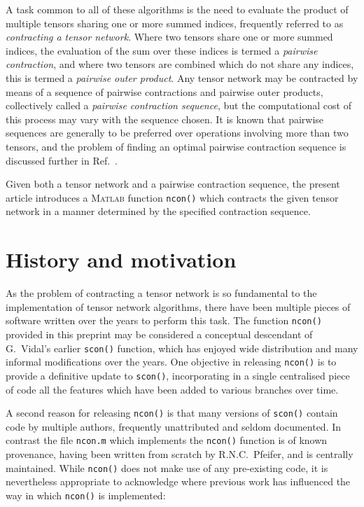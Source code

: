 \documentclass[aps,prb,reprint,superscriptaddress,amsmath,amsfonts]{revtex4-1}
\theoremstyle{definition}
\newcommand{\rcite}[1]{Ref.~\onlinecite{#1}}
\newcommand{\MATLAB}{\textsc{Matlab}}
\newcommand{\ttt}[1]{\texttt{#1}}
\begin{document}
A task common to all of these algorithms is the need to evaluate the product of multiple tensors sharing one or more summed indices, frequently referred to as \emph{contracting a tensor network}. Where two tensors share one or more summed indices, the evaluation of the sum over these indices is termed a \emph{pairwise contraction}, and where two tensors are combined which do not share any indices, this is termed a \emph{pairwise outer product}. Any tensor network may be contracted by means of a sequence of pairwise contractions and pairwise outer products, collectively called a \emph{pairwise contraction sequence}, but the computational cost of this process may vary with the sequence chosen. It is known\cite{pfeifer2013a} that pairwise sequences are generally to be preferred over operations involving more than two tensors, and the problem of finding an optimal pairwise contraction sequence is discussed further in \rcite{pfeifer2013a}.

Given both a tensor network and a pairwise contraction sequence, the present article introduces a \MATLAB{} function \ttt{ncon()} which contracts the given tensor network in a manner determined by the specified contraction sequence.


\section{History and motivation\label{sec:history}}

As the problem of contracting a tensor network is so fundamental to the implementation of tensor network algorithms, there have been multiple pieces of software written over the years to perform this task. The function \ttt{ncon()} provided in this preprint %
may be considered a conceptual descendant of G.~Vidal's earlier \ttt{scon()} function, which has enjoyed wide distribution and many informal modifications over the years. One objective in releasing \ttt{ncon()} is to provide a definitive update to \ttt{scon()}, incorporating in a single centralised piece of code all the features which have been added to various branches over time. 

A second reason for releasing \ttt{ncon()} is that many versions of \ttt{scon()} contain code by multiple authors, frequently unattributed and seldom documented. In contrast the file \ttt{ncon.m} which implements the \ttt{ncon()} function is of known provenance, having been written from scratch by R.N.C.~Pfeifer, and is centrally maintained. While \ttt{ncon()} does not make use of any pre-existing code, it is nevertheless appropriate to acknowledge where previous work has influenced the way in which \ttt{ncon()} is implemented:
\end{document}
